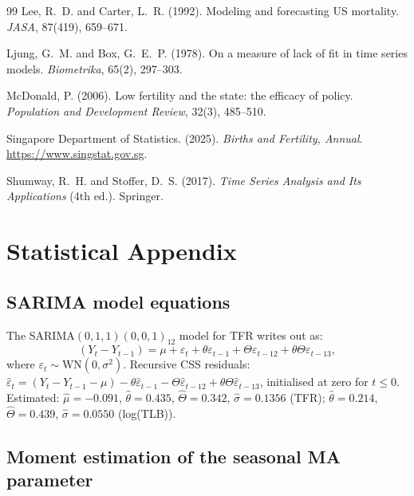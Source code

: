 \documentclass[12pt,a4paper]{article}
\begin{document}
\begin{thebibliography}{99}
Lee, R.\ D. and Carter, L.\ R. (1992). Modeling and forecasting US mortality.
\textit{JASA}, 87(419), 659--671.

Ljung, G.\ M. and Box, G.\ E.\ P. (1978). On a measure of lack of fit in time
series models. \textit{Biometrika}, 65(2), 297--303.

McDonald, P. (2006). Low fertility and the state: the efficacy of policy.
\textit{Population and Development Review}, 32(3), 485--510.

Singapore Department of Statistics. (2025). \textit{Births and Fertility, Annual}.
\url{https://www.singstat.gov.sg}.

Shumway, R.\ H. and Stoffer, D.\ S. (2017). \textit{Time Series Analysis and Its
Applications} (4th ed.). Springer.

\end{thebibliography}

\clearpage
\appendix
\section{Statistical Appendix}
\label{app:stat}

\subsection{SARIMA model equations}

The SARIMA$(0,1,1)(0,0,1)_{12}$ model for TFR writes out as:
\begin{equation}
  (Y_t - Y_{t-1}) = \mu + \varepsilon_t + \theta\varepsilon_{t-1}
    + \Theta\varepsilon_{t-12} + \theta\Theta\varepsilon_{t-13},
\end{equation}
where $\varepsilon_t\sim\mathrm{WN}(0,\sigma^2)$.
Recursive CSS residuals: $\hat\varepsilon_t =
(Y_t - Y_{t-1} - \mu) - \theta\hat\varepsilon_{t-1}
- \Theta\hat\varepsilon_{t-12} + \theta\Theta\hat\varepsilon_{t-13}$,
initialised at zero for $t\leq 0$.
Estimated: $\hat\mu=-0.091$, $\hat\theta=0.435$, $\hat\Theta=0.342$,
$\hat\sigma=0.1356$ (TFR);
$\hat\theta=0.214$, $\hat\Theta=0.439$, $\hat\sigma=0.0550$ (log(TLB)).

\subsection{Moment estimation of the seasonal MA parameter}
\end{document}
